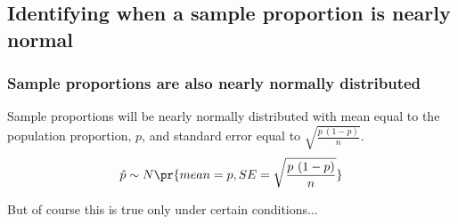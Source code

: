 
\subsection{Identifying when a sample proportion is nearly normal}


\begin{frame}
\frametitle{Sample proportions are also nearly normally distributed}

{
Sample proportions will be nearly normally distributed with mean equal to the population proportion, $p$, and standard error equal to $\sqrt{\frac{p~(1-p)}{n}}$.
\[ \hat{p} \sim N \pr{ mean = p, SE = \sqrt{\frac{p~(1-p)}{n}} } \]
}

But of course this is true only under certain conditions...



\pause


\end{frame}


%
%
%
%

